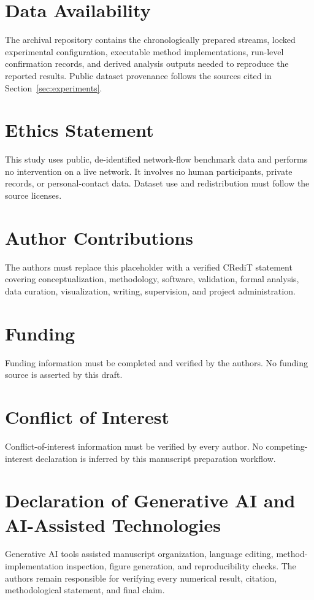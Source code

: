 \documentclass{ieeeaccess}
\begin{document}
\section*{Data Availability}
The archival repository contains the chronologically prepared streams, locked experimental configuration, executable method implementations, run-level confirmation records, and derived analysis outputs needed to reproduce the reported results. Public dataset provenance follows the sources cited in Section~\ref{sec:experiments}.

\section*{Ethics Statement}
This study uses public, de-identified network-flow benchmark data and performs no intervention on a live network. It involves no human participants, private records, or personal-contact data. Dataset use and redistribution must follow the source licenses.

\section*{Author Contributions}
The authors must replace this placeholder with a verified CRediT statement covering conceptualization, methodology, software, validation, formal analysis, data curation, visualization, writing, supervision, and project administration.

\section*{Funding}
Funding information must be completed and verified by the authors. No funding source is asserted by this draft.

\section*{Conflict of Interest}
Conflict-of-interest information must be verified by every author. No competing-interest declaration is inferred by this manuscript preparation workflow.

\section*{Declaration of Generative AI and AI-Assisted Technologies}
Generative AI tools assisted manuscript organization, language editing, method-implementation inspection, figure generation, and reproducibility checks. The authors remain responsible for verifying every numerical result, citation, methodological statement, and final claim.
\end{document}
